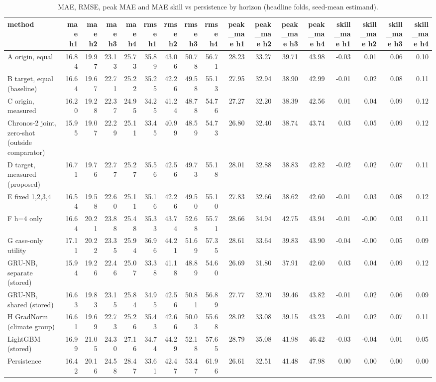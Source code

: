 \begin{table}[t]
\centering
\small
\caption{MAE, RMSE, peak MAE and MAE skill vs persistence by horizon (headline folds, seed-mean estimand).}
\label{tab:metrics-headline-seed-mean}
\begin{tabular}{lrrrrrrrrrrrrrrrr}
\toprule
method & mae h1 & mae h2 & mae h3 & mae h4 & rmse h1 & rmse h2 & rmse h3 & rmse h4 & peak\_mae h1 & peak\_mae h2 & peak\_mae h3 & peak\_mae h4 & skill\_mae h1 & skill\_mae h2 & skill\_mae h3 & skill\_mae h4 \\
\midrule
A origin, equal & 16.84 & 19.97 & 23.13 & 25.73 & 35.89 & 43.06 & 50.78 & 56.71 & 28.23 & 33.27 & 39.71 & 43.98 & -0.03 & 0.01 & 0.06 & 0.10 \\
B target, equal (baseline) & 16.64 & 19.67 & 22.71 & 25.22 & 35.25 & 42.26 & 49.58 & 55.13 & 27.95 & 32.94 & 38.90 & 42.99 & -0.01 & 0.02 & 0.08 & 0.11 \\
C origin, measured & 16.20 & 19.28 & 22.37 & 24.95 & 34.25 & 41.24 & 48.78 & 54.76 & 27.27 & 32.20 & 38.39 & 42.56 & 0.01 & 0.04 & 0.09 & 0.12 \\
Chronos-2 joint, zero-shot (outside comparator) & 15.95 & 19.07 & 22.29 & 25.11 & 33.45 & 40.99 & 48.59 & 54.73 & 26.80 & 32.40 & 38.74 & 43.74 & 0.03 & 0.05 & 0.09 & 0.12 \\
D target, measured (proposed) & 16.71 & 19.76 & 22.77 & 25.27 & 35.56 & 42.56 & 49.73 & 55.18 & 28.01 & 32.88 & 38.83 & 42.82 & -0.02 & 0.02 & 0.07 & 0.11 \\
E fixed 1,2,3,4 & 16.54 & 19.58 & 22.60 & 25.11 & 35.16 & 42.26 & 49.50 & 55.10 & 27.83 & 32.66 & 38.62 & 42.60 & -0.01 & 0.03 & 0.08 & 0.12 \\
F h=4 only & 16.64 & 20.21 & 23.88 & 25.48 & 35.33 & 43.74 & 52.68 & 55.71 & 28.66 & 34.94 & 42.75 & 43.94 & -0.01 & -0.00 & 0.03 & 0.11 \\
G case-only utility & 17.11 & 20.22 & 23.35 & 25.94 & 36.96 & 44.21 & 51.69 & 57.35 & 28.61 & 33.64 & 39.83 & 43.90 & -0.04 & -0.00 & 0.05 & 0.09 \\
GRU-NB, separate (stored) & 15.94 & 19.26 & 22.46 & 25.07 & 33.38 & 41.18 & 48.89 & 54.60 & 26.69 & 31.80 & 37.91 & 42.60 & 0.03 & 0.04 & 0.09 & 0.12 \\
GRU-NB, shared (stored) & 16.63 & 19.83 & 23.15 & 25.84 & 34.95 & 42.56 & 50.81 & 56.89 & 27.77 & 32.70 & 39.46 & 43.82 & -0.01 & 0.02 & 0.06 & 0.09 \\
H GradNorm (climate group) & 16.61 & 19.69 & 22.73 & 25.26 & 35.43 & 42.66 & 50.03 & 55.68 & 28.02 & 33.08 & 39.15 & 43.23 & -0.01 & 0.02 & 0.07 & 0.11 \\
LightGBM (stored) & 16.99 & 21.05 & 24.30 & 27.16 & 34.74 & 44.29 & 52.18 & 57.65 & 28.79 & 35.08 & 41.98 & 46.42 & -0.03 & -0.04 & 0.01 & 0.05 \\
Persistence & 16.42 & 20.16 & 24.58 & 28.47 & 33.61 & 42.47 & 53.47 & 61.96 & 26.61 & 32.51 & 41.48 & 47.98 & 0.00 & 0.00 & 0.00 & 0.00 \\
\bottomrule
\end{tabular}
\end{table}

